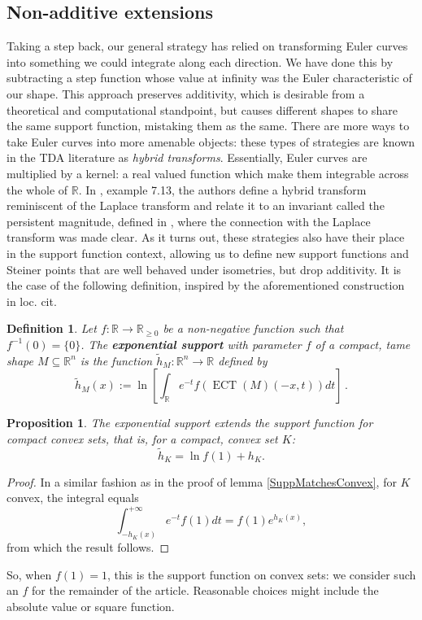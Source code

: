 \documentclass[a4paper]{article}
\newtheorem{prop}[theorem]{Proposition}
\newtheorem{definition}[theorem]{Definition}
\newcommand{\ECT}{\operatorname{ECT}}
\newcommand{\bb}{\mathbb}
\begin{document}
\subsection{Non-additive extensions}

Taking a step back, our general strategy has relied on transforming Euler curves into something we could integrate along each direction. We have done this by subtracting a step function whose value at infinity was the Euler characteristic of our shape. This approach preserves additivity, which is desirable from a theoretical and computational standpoint, but causes different shapes to share the same support function, mistaking them as the same. There are more ways to take Euler curves into more amenable objects: these types of strategies are known in the TDA literature as \emph{hybrid transforms}. Essentially, Euler curves are multiplied by a kernel: a real valued function which make them integrable across the whole of $\bb R$. In \cite{lebovici_hybrid_2024}, example 7.13, the authors define a hybrid transform reminiscent of the Laplace transform and relate it to an invariant called the persistent magnitude, defined in \cite{govc2021persistent}, where the connection with the Laplace transform was made clear. As it turns out, these strategies also have their place in the support function context, allowing us to define new support functions and Steiner points that are well behaved under isometries, but drop additivity. It is the case of the following definition, inspired by the aforementioned construction in loc. cit.

\begin{definition}
	Let $f: \bb R \to \bb R_{\geq 0}$ be a non-negative function such that $f^{-1}(0)=\{0\}$. The \textbf{exponential support} with parameter $f$ of a compact, tame shape $M \subseteq \bb R^n$ is the function \linebreak${\tilde h_M: \bb R^n \to \bb R}$ defined by
	\[ \tilde h_M(x) :=\ln \left[ \int_{\bb R} e^{-t} f(\ECT(M)(-x,t)) dt \right] \, . \]
\end{definition}

\begin{prop}
	The exponential support extends the support function for compact convex sets, that is, for a compact, convex set $K$:
	\[ \tilde h_K = \ln f(1) + h_K.\]
\end{prop}

\begin{proof}
	In a similar fashion as in the proof of lemma \ref{SuppMatchesConvex}, for $K$ convex, the integral equals
	\[ \int_{-h_K(x)}^{+\infty} e^{-t} f(1) dt= f(1) e^{h_K(x)},\]
	from which the result follows.
\end{proof}
So, when $f(1)=1$, this is the support function on convex sets: we consider such an $f$ for the remainder of the article. Reasonable choices might include the absolute value or square function.
\end{document}
